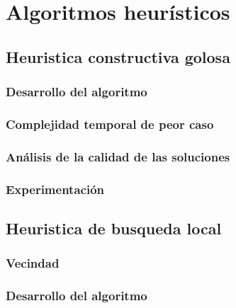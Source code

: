 \documentclass[a4paper, 10pt, twoside]{article}
\begin{document}
\section{Algoritmos heurísticos}
\label{sec:algoritmos-heuristicos}

  \subsection{Heuristica constructiva golosa}
  \label{sub:algoritmos-heuristicos-goloso}
      \subsubsection{Desarrollo del algoritmo}
      \label{subsub:algoritmos-heuristicos-goloso-desarrollo.tex}
      

      \subsubsection{Complejidad temporal de peor caso}
      \label{subsub:algoritmos-heuristicos-goloso-complejidad.tex}
      

      \subsubsection{Análisis de la calidad de las soluciones}
      \label{subsub:algoritmos-heuristicos-goloso-calidad.tex}
      

      \subsubsection{Experimentación}
      \label{subsub:algoritmos-heuristicos-goloso-experimentacion.tex}
      
  \newpage

  \subsection{Heuristica de busqueda local}
  \label{sub:algoritmos-heuristicos-busqueda}
      \subsubsection{Vecindad}
      \label{subsub:algoritmos-heuristicos-busqueda-desarrollo_vecindad.tex}
      

      \subsubsection{Desarrollo del algoritmo}
      \label{subsub:algoritmos-heuristicos-busqueda-desarrollo_algoritmo.tex}
      
      
\end{document}
